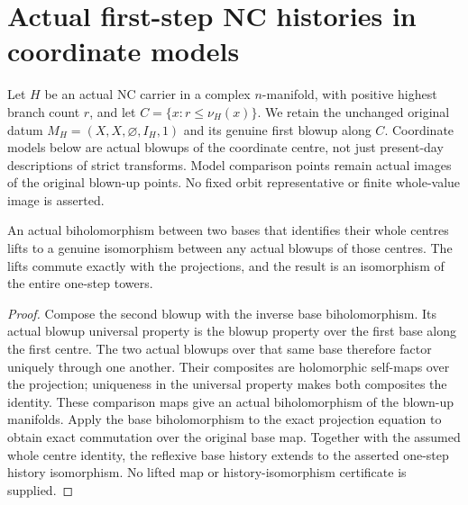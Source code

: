 \section{Actual first-step NC histories in coordinate models}
\label{sec:hironaka-normal-crossings-first-step-chart-history}

Let $H$ be an actual NC carrier in a complex $n$-manifold, with positive
highest branch count $r$, and let $C=\{x:r\leq\nu_H(x)\}$. We retain
the unchanged original datum $M_H=(X,X,\varnothing,I_H,1)$ and its genuine
first blowup along $C$. Coordinate models below are actual blowups of
the coordinate centre, not just present-day descriptions of strict transforms.
Model comparison points remain actual images of the original blown-up
points. No fixed orbit representative or finite whole-value image is asserted.

\begin{lemma}
\label{hir:general-nc-one-step-history-universal-comparison}
\leanok
{}
An actual biholomorphism between two bases that identifies their whole
centres lifts to a genuine isomorphism between any actual blowups of
those centres. The lifts commute exactly with the projections, and the
result is an isomorphism of the entire one-step towers.
\end{lemma}
\begin{proof}
Compose the second blowup with the inverse base biholomorphism. Its
actual blowup universal property is the blowup property over the first
base along the first centre. The two actual blowups over that same base
therefore factor uniquely through one another. Their composites are
holomorphic self-maps over the projection; uniqueness in the universal
property makes both composites the identity. These comparison maps give
an actual biholomorphism of the blown-up manifolds. Apply the base
biholomorphism to the exact projection equation to obtain exact
commutation over the original base map. Together with the assumed whole
centre identity, the reflexive base history extends to the asserted
one-step history isomorphism. No lifted map or history-isomorphism
certificate is supplied.
\end{proof}

